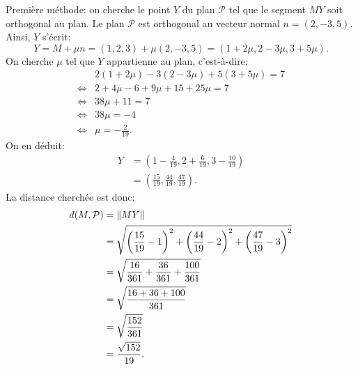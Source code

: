 {\begin{td-sol}[]
\begin{enumerate}
			Première méthode: on cherche le point \(Y\) du plan \(\mathcal P\) tel que le segment \(MY\) soit orthogonal au plan.
			Le plan \(\mathcal P\) est orthogonal au vecteur normal \(n = (2, -3, 5)\). Ainsi, \(Y\) s'écrit:
			\begin{equation*}
				Y = M + \mu n = (1, 2, 3) + \mu(2, -3, 5) = (1 + 2\mu, 2 - 3\mu, 3 + 5\mu).
			\end{equation*}
			On cherche \(\mu\) tel que \(Y\) appartienne au plan, c'est-à-dire:
			\begin{equation*}
				\begin{aligned}
					&2(1 + 2\mu) - 3(2 - 3\mu) + 5(3 + 5\mu) = 7\\
					\iff & 2 + 4\mu - 6 + 9\mu + 15 + 25\mu = 7\\
					\iff & 38\mu + 11 = 7\\
					\iff & 38\mu = -4\\
					\iff & \mu = -\frac{2}{19}.
				\end{aligned}
			\end{equation*}
			On en déduit:
			\begin{equation*}
				\begin{aligned}
					Y 
					&= \left(1 - \frac{4}{19}, 2 + \frac{6}{19}, 3 - \frac{10}{19}\right)\\
					&= \left(\frac{15}{19}, \frac{44}{19}, \frac{47}{19}\right).
				\end{aligned}
			\end{equation*}
			La distance cherchée est donc:
			\begin{equation*}
				\begin{aligned}
					d(M, \mathcal P) 
					&= \mathopen{}\left\|MY\right\|\mathclose{} \\
					&= \sqrt{{\left(\frac{15}{19} - 1\right)}^2 + {\left(\frac{44}{19} - 2\right)}^2 + {\left(\frac{47}{19} - 3\right)}^2} \\
					&= \sqrt{\frac{16}{361} + \frac{36}{361} + \frac{100}{361}} \\
					&= \sqrt{\frac{16 + 36 + 100}{361}} \\
					&= \sqrt{\frac{152}{361}} \\
					&= \frac{\sqrt{152}}{19}.
				\end{aligned}
			\end{equation*}


\end{enumerate}
\end{td-sol}}
